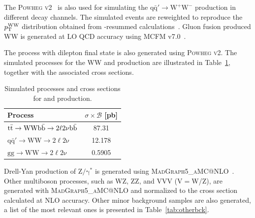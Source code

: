 The \textsc{Powheg v2}~\cite{Melia:2011tj} is also used for simulating the $\mathrm{q\bar{q}' \to W^+W^-}$ production in different decay channels. The simulated events are reweighted to reproduce the $p_\mathrm{T}^\mathrm{WW}$ distribution obtained from \pt-resummed calculations~\cite{Meade:2014fca,Jaiswal:2014yba}. Gluon fusion produced WW is generated at LO QCD accuracy using \textsc{MCFM} v7.0~\cite{Campbell:2013wga}.

The \ttbar process with dilepton final state is also generated using \textsc{Powheg v2}. The simulated processes for the WW and \ttbar production are illustrated in Table~\ref{tab:wwl}, together with the associated cross sections.

\begin{table}[htb]
\caption{Simulated processes and cross sections for \ttbar and \WW production.}\label{tab:wwl}
\begin{center}
\begin{tabular}{lc}
\toprule
Process & $\sigma\times\mathcal{B}$ [pb] \\
\midrule
$\mathrm{\mathrm{t}\bar{\mathrm{t}}\to WW b\bar{b}\to 2\ell2\nu b\bar{b}}$ & 87.31 \\
$\mathrm{q\bar{q}'\to WW \to 2\ell2\nu}$ & 12.178 \\
$\mathrm{gg\to WW \to 2\ell2\nu}$ & 0.5905 \\
\bottomrule
\end{tabular}
\end{center}
\end{table}

Drell-Yan production of $\mathrm{Z/\gamma^{*}}$ is generated using \textsc{MadGraph5\_aMC@NLO}~\cite{Alwall:2014hca}. 
Other multiboson processes, such as WZ, ZZ, and VVV (V$=$W/Z), are generated with \textsc{MadGraph5\_aMC@NLO} and normalized to the cross section calculated at NLO accuracy. Other minor background samples are also generated, a list of the most relevant ones is presented in Table~\ref{tab:otherbck}.


